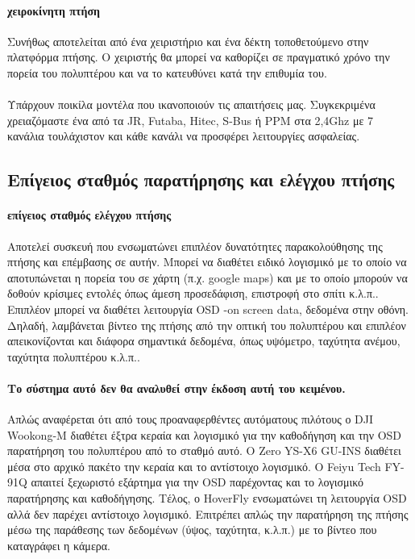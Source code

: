 \documentclass[a4paper, 12pt, twoside]{report}
\begin{document}
{{{{{{			\paragraph{χειροκίνητη πτήση}{Συνήθως αποτελείται από ένα χειριστήριο και ένα δέκτη τοποθετούμενο στην πλατφόρμα πτήσης. Ο χειριστής θα μπορεί να καθορίζει σε πραγματικό χρόνο την πορεία του πολυπτέρου και να το κατευθύνει κατά την επιθυμία του.
			}
			\paragraph{}{Υπάρχουν ποικίλα μοντέλα που ικανοποιούν τις απαιτήσεις μας. Συγκεκριμένα χρειαζόμαστε ένα από τα JR, Futaba, Hitec, S-Bus ή PPM στα 2,4Ghz με 7 κανάλια τουλάχιστον και κάθε κανάλι να προσφέρει λειτουργίες ασφαλείας.
			}
			
		\subsection{Επίγειος σταθμός παρατήρησης και ελέγχου πτήσης}	
			\paragraph{επίγειος σταθμός ελέγχου πτήσης}{Αποτελεί συσκευή που ενσωματώνει επιπλέον δυνατότητες παρακολούθησης της πτήσης και επέμβασης σε αυτήν. Μπορεί να διαθέτει ειδικό λογισμικό με το οποίο να αποτυπώνεται η πορεία του σε χάρτη (π.χ. google maps) και με το οποίο μπορούν να δοθούν κρίσιμες εντολές όπως άμεση προσεδάφιση, επιστροφή στο σπίτι κ.λ.π.. Επιπλέον μπορεί να διαθέτει λειτουργία OSD -on screen data, δεδομένα στην οθόνη. Δηλαδή, λαμβάνεται βίντεο της πτήσης από την οπτική του πολυπτέρου και επιπλέον απεικονίζονται και διάφορα σημαντικά δεδομένα, όπως υψόμετρο, ταχύτητα ανέμου, ταχύτητα πολυπτέρου κ.λ.π..
			}
			\paragraph{Το σύστημα αυτό δεν θα αναλυθεί στην έκδοση αυτή του κειμένου.}{Απλώς αναφέρεται ότι από τους προαναφερθέντες αυτόματους πιλότους ο DJI Wookong-M διαθέτει έξτρα κεραία και λογισμικό για την καθοδήγηση και την OSD παρατήρηση του πολυπτέρου από το σταθμό αυτό. Ο Zero YS-X6 GU-INS διαθέτει μέσα στο αρχικό πακέτο την κεραία και το αντίστοιχο λογισμικό. Ο Feiyu Tech FY-91Q απαιτεί ξεχωριστό εξάρτημα για την OSD παρέχοντας και το λογισμικό παρατήρησης και καθοδήγησης. Τέλος, ο HoverFly ενσωματώνει τη λειτουργία OSD αλλά δεν παρέχει αντίστοιχο λογισμικό. Επιτρέπει απλώς την παρατήρηση της πτήσης μέσω της παράθεσης των δεδομένων (ύψος, ταχύτητα, κ.λ.π.) με το βίντεο που καταγράφει η κάμερα.
			}
			
}}}}}}
\end{document}
